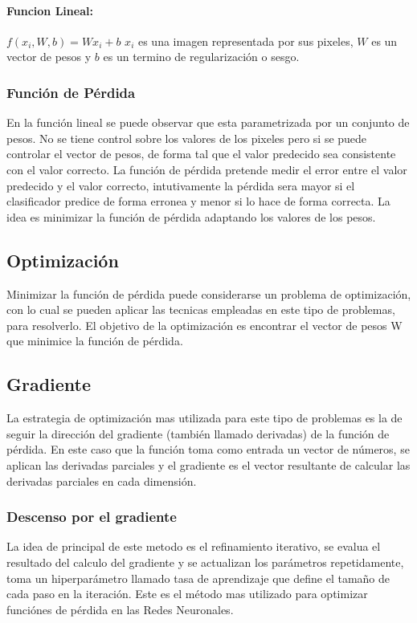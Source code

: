 \documentclass[a4paper,11pt,spanish]{book}
\begin{document}
	\paragraph{Funcion Lineal:} 
	  $f(x_i,W,b)=Wx_i+b$
	  $x_i$ es una imagen representada por sus pixeles, $W$ es un vector de pesos y $b$ es un termino de regularización o sesgo.

      \subsubsection{Función de Pérdida}
	En la función lineal se puede observar que esta parametrizada por un conjunto de pesos.
	No se tiene control sobre los valores de los pixeles pero si se puede controlar el vector de pesos, de forma tal que el valor predecido sea consistente con el valor correcto. 
	La función de pérdida pretende medir el error entre el valor predecido y el valor correcto, intutivamente la pérdida sera mayor si el clasificador predice de forma erronea y 
	menor si lo hace de forma correcta.
	La idea es minimizar la función de pérdida adaptando los valores de los pesos.

    \subsection{Optimización}
      Minimizar la función de pérdida puede considerarse un problema de optimización, con lo cual se pueden aplicar las tecnicas empleadas en este tipo de problemas, para resolverlo.
      El objetivo de la optimización es encontrar el vector de pesos W que minimice la función de pérdida.

    \subsection{Gradiente} 
      La estrategia de optimización mas utilizada para este tipo de problemas es la de seguir la dirección del gradiente (también llamado derivadas) de la función de pérdida.
      En este caso que la función toma como entrada un vector de números, se aplican las derivadas parciales y el gradiente es el vector resultante de calcular las derivadas parciales
      en cada dimensión.

      \subsubsection{Descenso por el gradiente}
	La idea de principal de este metodo es el refinamiento iterativo, se evalua el resultado del calculo del gradiente y se actualizan los parámetros repetidamente, 
	toma un hiperparámetro llamado tasa de aprendizaje que define el tamaño de cada paso en la iteración.
	Este es el método mas utilizado para optimizar funciónes de pérdida en las Redes Neuronales. 
\end{document}
